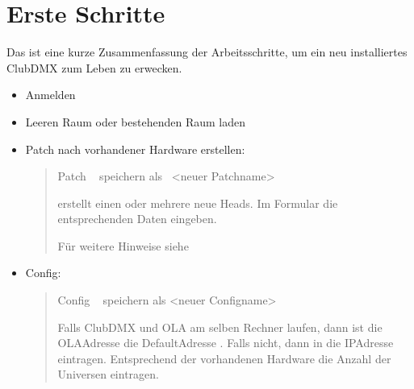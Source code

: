 \documentclass[letterpaper,10pt,ngerman]{sphinxmanual}
\begin{document}
\chapter{Erste Schritte}
\label{\detokenize{erste_schritte:erste-schritte}}\label{\detokenize{erste_schritte:erste-schritte-label}}\label{\detokenize{erste_schritte::doc}}
Das ist eine kurze Zusammenfassung der Arbeitsschritte, um ein neu
installiertes ClubDMX zum Leben zu erwecken.
\begin{itemize}
\item {} 
Anmelden

\item {} \begin{description}
\item[{Leeren Raum oder bestehenden Raum laden}] \leavevmode
{}

\end{description}

\item {} 
Patch nach vorhandener Hardware erstellen:
\begin{quote}

Patch   speichern als  \textless{}neuer Patchname\textgreater{}

 erstellt einen oder mehrere neue Heads.
Im Formular die entsprechenden Daten eingeben.

Für weitere Hinweise siehe {\hyperref[\detokenize{patch:neupatchlabel}]{}}
\end{quote}

\item {} 
Config:
\begin{quote}

Config   speichern als \textless{}neuer Configname\textgreater{}

Falls ClubDMX und OLA am selben Rechner laufen, dann ist die OLA\sphinxhyphen{}Adresse die
Default\sphinxhyphen{}Adresse . Falls nicht, dann
in  die IP\sphinxhyphen{}Adresse
eintragen. Entsprechend der vorhandenen Hardware die Anzahl der
Universen eintragen.
\end{quote}


\end{itemize}
\end{document}

